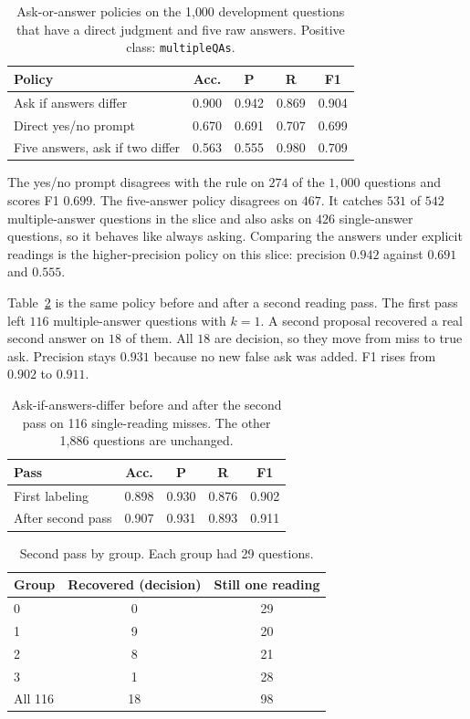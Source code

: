 \documentclass[journal]{IEEEtran}
\begin{document}
\begin{table}[!t]
\caption{Ask-or-answer policies on the 1{,}000 development questions that have a direct judgment and five raw answers. Positive class: \texttt{multipleQAs}.}
\label{tab:prompt}
\centering
\begin{tabular}{lcccc}
\toprule
Policy & Acc. & P & R & F1 \\
\midrule
Ask if answers differ & 0.900 & 0.942 & 0.869 & 0.904 \\
Direct yes/no prompt & 0.670 & 0.691 & 0.707 & 0.699 \\
Five answers, ask if two differ & 0.563 & 0.555 & 0.980 & 0.709 \\
\bottomrule
\end{tabular}
\end{table}

The yes/no prompt disagrees with the rule on $274$ of the $1{,}000$ questions and scores F1 $0.699$.
The five-answer policy disagrees on $467$.
It catches $531$ of $542$ multiple-answer questions in the slice and also asks on $426$ single-answer questions, so it behaves like always asking.
Comparing the answers under explicit readings is the higher-precision policy on this slice: precision $0.942$ against $0.691$ and $0.555$.

Table~\ref{tab:second} is the same policy before and after a second reading pass.
The first pass left $116$ multiple-answer questions with $k=1$.
A second proposal recovered a real second answer on $18$ of them.
All $18$ are decision, so they move from miss to true ask.
Precision stays $0.931$ because no new false ask was added.
F1 rises from $0.902$ to $0.911$.

\begin{table}[!t]
\caption{Ask-if-answers-differ before and after the second pass on 116 single-reading misses. The other 1{,}886 questions are unchanged.}
\label{tab:second}
\centering
\begin{tabular}{lcccc}
\toprule
Pass & Acc. & P & R & F1 \\
\midrule
First labeling & 0.898 & 0.930 & 0.876 & 0.902 \\
After second pass & 0.907 & 0.931 & 0.893 & 0.911 \\
\bottomrule
\end{tabular}
\end{table}

\begin{table}[!t]
\caption{Second pass by group. Each group had 29 questions.}
\label{tab:groups}
\centering
\begin{tabular}{lcc}
\toprule
Group & Recovered (decision) & Still one reading \\
\midrule
0 & 0 & 29 \\
1 & 9 & 20 \\
2 & 8 & 21 \\
3 & 1 & 28 \\
\midrule
All 116 & 18 & 98 \\
\bottomrule
\end{tabular}
\end{table}
\end{document}
